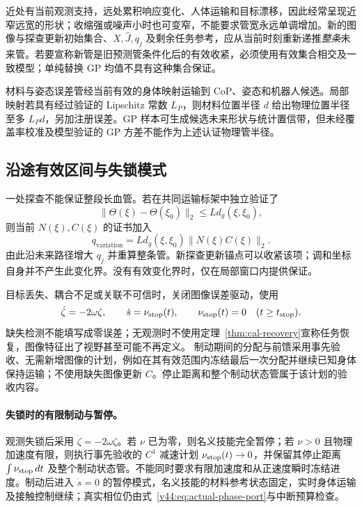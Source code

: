 \documentclass[11pt,a4paper]{article}
\numberwithin{equation}{section}
\theoremstyle{definition}
\begin{document}
近处有当前观测支持，远处累积响应变化、人体运输和目标漂移，因此经常呈现近窄远宽的形状；收缩强或噪声小时也可变窄，不能要求管宽永远单调增加。新的图像与探查更新初始集合、$X,\widehat J,q_j$ 及剩余任务参考，应从当前时刻重新递推\emph{整条}未来管。若要宣称新管是旧预测管条件化后的有效收紧，必须使用有效集合相交及一致模型；单纯替换 GP 均值不具有这种集合保证。

材料与姿态误差管经当前有效的身体映射运输到 CoP、姿态和机器人候选。局部映射若具有经过验证的 Lipschitz 常数 $L_P$，则材料位置半径 $d$ 给出物理位置半径至多 $L_Pd$，另加注册误差。GP 样本可生成候选未来形状与统计置信带，但未经覆盖率校准及模型验证的 GP 方差不能作为上述认证物理管半径。

\subsection{沿途有效区间与失锁模式}

一处探查不能保证整段长血管。若在共同运输标架中独立验证了
\begin{equation}
 \|\Theta(\xi)-\Theta(\xi_0)\|_2
      \le Ld_g(\xi,\xi_0),
 \label{eq:cal-spatial-variation}
\end{equation}
则当前 $N(\xi),C(\xi)$ 的证书加入
\begin{equation}
 q_{\mathrm{variation}}=
    Ld_g(\xi,\xi_0)\|N(\xi)C(\xi)\|_2.
 \label{eq:cal-variation-q}
\end{equation}
由此沿未来路径增大 $q_j$ 并重算整条管。新探查更新锚点可以收紧该项；调和坐标自身并不产生此变化界。没有有效变化界时，仅在局部窗口内提供保证。

目标丢失、耦合不足或关联不可信时，关闭图像误差驱动，使用
\begin{equation}
 \dot\zeta=-2\omega\zeta,\qquad\dot s=\nu_{\rm stop}(t),
 \qquad \nu_{\rm stop}(t)=0\quad(t\ge t_{\rm stop}).
 \label{eq:cal-loss-mode}
\end{equation}
缺失检测不能填写成零误差；无观测时不使用定理~\ref{thm:cal-recovery}宣称任务恢复，图像特征出了视野甚至可能不再定义。
制动期间的分配与前馈采用事先验收、无需新增图像的计划，例如在其有效范围内冻结最后一次分配并继续已知身体保持运输；不使用缺失图像更新 $C$。停止距离和整个制动状态管属于该计划的验收内容。

\paragraph{失锁时的有限制动与暂停。}
观测失锁后采用 $\dot\zeta=-2\omega\zeta$。若 $\nu$ 已为零，则名义技能完全暂停；若 $\nu>0$ 且物理加速度有限，则执行事先验收的 $C^1$ 减速计划 $\nu_{\rm stop}(t)\to0$，并保留其停止距离 $\int\nu_{\rm stop}\,dt$ 及整个制动状态管。不能同时要求有限加速度和从正速度瞬时冻结进度。制动后进入 $\dot s=0$ 的暂停模式，名义技能的材料参考状态固定，实时身体运输及接触控制继续；真实相位仍由式~\eqref{v44:eq:actual-phase-port}与中断预算检查。
\end{document}
